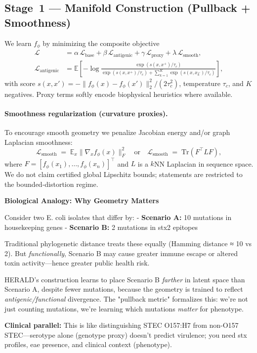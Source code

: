 \documentclass[11pt]{article}
\begin{document}
\subsection{Stage 1 — Manifold Construction (Pullback + Smoothness)}
We learn $f_\phi$ by minimizing the composite objective
\begin{align}
\mathcal{L}
&= \alpha\,\mathcal{L}_{\text{base}}
+ \beta\,\mathcal{L}_{\text{antigenic}}
+ \gamma\,\mathcal{L}_{\text{proxy}}
+ \lambda\,\mathcal{L}_{\text{smooth}}, \label{eq:masterloss}
\\[-0.25em]
\mathcal{L}_{\text{antigenic}}
&= \mathbb{E}\!\left[
-\log \frac{\exp(s(x,x^+)/\tau_c)}{\exp(s(x,x^+)/\tau_c)+\sum_{k=1}^{K}\exp(s(x,x_k^-)/\tau_c)}
\right],
\end{align}
with score $s(x,x')=-\|f_\phi(x)-f_\phi(x')\|_2^2/(2\tau_c^2)$, temperature $\tau_c$, and $K$ negatives. Proxy terms softly encode biophysical heuristics where available.

\paragraph{Smoothness regularization (curvature proxies).}
To encourage smooth geometry we penalize Jacobian energy and/or graph Laplacian smoothness:
\begin{equation}
\mathcal{L}_{\text{smooth}} \;=\; \mathbb{E}_x \big\| \nabla_x f_\phi(x) \big\|_F^2
\quad\text{or}\quad
\mathcal{L}_{\text{smooth}} \;=\; \mathrm{Tr}(F^{\top} L F),
\end{equation}
where $F=[f_\phi(x_1),\ldots,f_\phi(x_n)]^{\top}$ and $L$ is a $k$NN Laplacian in sequence space. We do not claim certified global Lipschitz bounds; statements are restricted to the bounded-distortion regime.

\begin{mdframed}[backgroundcolor=green!5]
\textbf{Biological Analogy: Why Geometry Matters}

Consider two E. coli isolates that differ by:
- \textbf{Scenario A:} 10 mutations in housekeeping genes
- \textbf{Scenario B:} 2 mutations in stx2 epitopes

Traditional phylogenetic distance treats these equally (Hamming distance ≈ 10 vs 2). But \emph{functionally}, Scenario B may cause greater immune escape or altered toxin activity—hence greater public health risk.

HERALD's construction learns to place Scenario B \emph{farther} in latent space than Scenario A, despite fewer mutations, because the geometry is trained to reflect \emph{antigenic/functional} divergence. The "pullback metric" formalizes this: we're not just counting mutations, we're learning which mutations \emph{matter} for phenotype.

\textbf{Clinical parallel:} This is like distinguishing STEC O157:H7 from non-O157 STEC—serotype alone (genotype proxy) doesn't predict virulence; you need stx profiles, eae presence, and clinical context (phenotype).
\end{mdframed}
\end{document}
